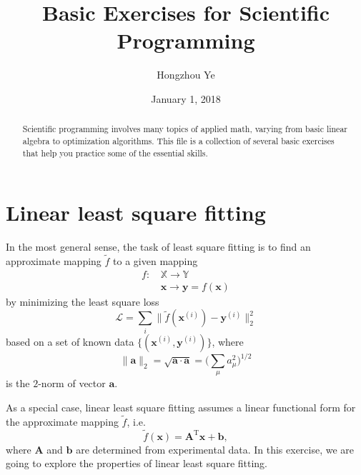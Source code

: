\documentclass[a4paper,twoside, 10pt]{article}
\title{Basic Exercises for Scientific Programming}
\author{Hongzhou Ye}
\date{January 1, 2018}							%
\theoremstyle{wick}
\newcommand{\tr}{\textrm}
\newcommand{\mat}[1]{\mathbf{#1}}
\begin{document}
	\maketitle{}

	\begin{abstract}
		Scientific programming involves many topics of applied math, varying from basic linear algebra to optimization algorithms. This file is a collection of several basic exercises that help you practice some of the essential skills.
	\end{abstract}

	\section{Linear least square fitting}

	In the most general sense, the task of least square fitting is to find an approximate mapping $\tilde{f}$ to a given mapping
	\begin{equation}
	\begin{split}
		f:&\, \mathbb{X} \rightarrow \mathbb{Y}	\\
		  &\, \bm{x} \rightarrow \bm{y} = f(\bm{x})
	\end{split}
	\end{equation}
	by minimizing the least square loss
	\begin{equation}
		\mathcal{L}
			= \sum_{i} \big\|\tilde{f}(\bm{x}^{(i)}) - \bm{y}^{(i)}\big\|_2^2
	\end{equation}
	based on a set of known data $\{(\bm{x}^{(i)}, \bm{y}^{(i)})\}$, where
	\begin{equation}
		\|\bm{a}\|_2
			= \sqrt{\bm{a} \cdot \bm{a}}
			= \bigg(\sum_{\mu} a_{\mu}^2\bigg)^{1/2}
	\end{equation}
	is the $2$-norm of vector $\bm{a}$.

	As a special case, linear least square fitting assumes a linear functional form for the approximate mapping $\tilde{f}$, i.e.
	\begin{equation}	\label{eq:lls_ansatz}
		\tilde{f}(\bm{x})
			= \mat{A}^{\tr{T}}\bm{x} + \bm{b},
	\end{equation}
	where $\mat{A}$ and $\bm{b}$ are determined from experimental data. In this exercise, we are going to explore the properties of linear least square fitting.
\end{document}
